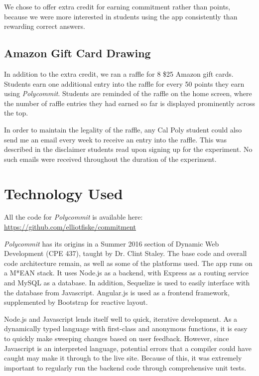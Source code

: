 \par We chose to offer extra credit for earning commitment rather than points, because we were more interested in students using the app consistently than rewarding correct answers.

\subsection{Amazon Gift Card Drawing}

\par In addition to the extra credit, we ran a raffle for 8 \$25 Amazon gift cards. Students earn one additional entry into the raffle for every 50 points they earn using \textit{Polycommit}. Students are reminded of the raffle on the home screen, where the number of raffle entries they had earned so far is displayed prominently across the top.

\par In order to maintain the legality of the raffle, any Cal Poly student could also send me an email every week to receive an entry into the raffle. This was described in the disclaimer students read upon signing up for the experiment. No such emails were received throughout the duration of the experiment.

\section{Technology Used}
\par All the code for \textit{Polycommit} is available here:
\hyperref[https://github.com/elliotfiske/commitment]{https://github.com/elliotfiske/commitment}

\par \textit{Polycommit} has its origins in a Summer 2016 section of Dynamic Web Development (CPE 437), taught by Dr. Clint Staley. The base code and overall code architecture remain, as well as some of the platforms used. The app runs on a M*EAN stack. It uses Node.js as a backend, with Express as a routing service and MySQL as a database. In addition, Sequelize is used to easily interface with the database from Javascript. Angular.js is used as a frontend framework, supplemented by Bootstrap for reactive layout.

\par Node.js and Javascript lends itself well to quick, iterative development. As a dynamically typed language with first-class and anonymous functions, it is easy to quickly make sweeping changes based on user feedback. However, since Javascript is an interpreted language, potential errors that a compiler could have caught may make it through to the live site. Because of this, it was extremely important to regularly run the backend code through comprehensive unit tests.

